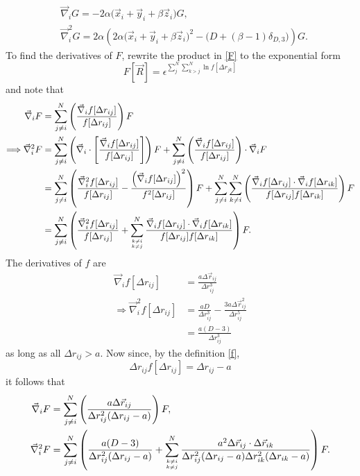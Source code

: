 \documentclass[a4paper,8pt]{article}
\begin{document}
\begin{align}
&\vec{\nabla}_i G = -2\alpha\Big(\vec{x}_i+\vec{y}_i+\beta\vec{z}_i\Big)G, \label{grad_G}\\
&\vec{\nabla}_i^2G = 2\alpha\left(2\alpha\Big(\vec{x}_i+\vec{y}_i+\beta\vec{z}_i\Big)^2-\Big(D+(\beta-1)\delta_{D,3}\Big)\right)G. \label{Lap_G}
\end{align}
To find the derivatives of $F$, rewrite the product in \eqref{F} to the exponential form 
\begin{equation}
F[\vec{R}] = \epsilon^{\sum\limits_{j}^N\sum\limits_{k > j}^N \ln f[\Delta{r}_{jk}]}
\end{equation}
and note that
\begin{align}
\vec{\nabla}_i F &= \sum\limits_{j \neq i}^N \left(\frac{\vec{\nabla}_i f[\Delta{r}_{ij}]}{f[\Delta{r}_{ij}]}\right) F \nonumber\\
\Longrightarrow \vec{\nabla}_i^2 F &= \sum\limits_{j \neq i}^N \left(\vec{\nabla}_i\cdot\left[\frac{\vec{\nabla}_i f[\Delta{r}_{ij}]}{f[\Delta{r}_{ij}]}\right]\right) F + \sum\limits_{j \neq i}^N \left(\frac{\vec{\nabla}_i f[\Delta{r}_{ij}]}{f[\Delta{r}_{ij}]}\right)\cdot \vec{\nabla}_i F \nonumber\\
&= \sum\limits_{j \neq i}^N \left(\frac{\vec{\nabla}_i^2 f[\Delta{r}_{ij}]}{f[\Delta{r}_{ij}]} - \frac{\left(\vec{\nabla}_i f[\Delta{r}_{ij}]\right)^2}{f^2[\Delta{r}_{ij}]}\right) F + \sum\limits_{j \neq i}^N \sum\limits_{k \neq i}^N \left(\frac{\vec{\nabla}_i f[\Delta{r}_{ij}] \cdot\vec{\nabla}_i f[\Delta{r}_{ik}]}{f[\Delta{r}_{ij}]f[\Delta{r}_{ik}]}\right) F \nonumber\\
&= \sum\limits_{j \neq i}^N \left(\frac{\vec{\nabla}_i^2 f[\Delta{r}_{ij}]}{f[\Delta{r}_{ij}]} + \sum\limits_{{k \neq i}\atop{k \neq j}}^N \frac{\vec{\nabla}_i f[\Delta{r}_{ij}] \cdot\vec{\nabla}_i f[\Delta{r}_{ik}]}{f[\Delta{r}_{ij}]f[\Delta{r}_{ik}]}\right) F. \nonumber
\end{align}
The derivatives of $f$ are
\begin{align}
\vec{\nabla}_i f[\Delta{r}_{ij}] &= \frac{a\Delta\vec{r}_{ij}}{\Delta{r}_{ij}^3} \\
\Longrightarrow \vec{\nabla}_i^2 f[\Delta{r}_{ij}] &= \frac{aD}{\Delta{r}_{ij}^3}-\frac{3a\Delta\vec{r}_{ij}^2}{\Delta{r}_{ij}^5} \nonumber\\
&= \frac{a(D-3)}{\Delta{r}_{ij}^3}
\end{align}
as long as all $\Delta{r}_{ij} > a$. Now since, by the definition \eqref{f}, 
\begin{equation}
\Delta{r}_{ij} f[\Delta{r}_{ij}] = \Delta{r}_{ij}-a \nonumber
\end{equation}
it follows that
\begin{align}
\vec{\nabla}_i F &= \sum\limits_{j \neq i}^N \left(\frac{a\Delta\vec{r}_{ij}}{\Delta{r}_{ij}^2(\Delta{r}_{ij}-a)}\right) F, \label{grad_F}\\
\vec{\nabla}_i^2 F &= \sum\limits_{j \neq i}^N \left(\frac{a(D-3)}{\Delta{r}_{ij}^2(\Delta{r}_{ij}-a)} + \sum\limits_{{k \neq i}\atop{k \neq j}}^N \frac{a^2 \Delta\vec{r}_{ij} \cdot \Delta\vec{r}_{ik}}{\Delta{r}_{ij}^2(\Delta{r}_{ij}-a) \Delta{r}_{ik}^2(\Delta{r}_{ik}-a)}\right) F. \label{Lap_F}
\end{align}
\end{document}
